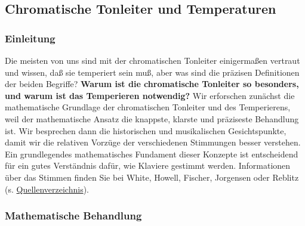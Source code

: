 
\subsection{Chromatische Tonleiter und Temperaturen}
\label{c2_2}

\subsubsection{Einleitung}
\label{c2_2a} 

Die meisten von uns sind mit der chromatischen Tonleiter einigermaßen vertraut und wissen, daß sie temperiert sein muß, aber was sind die präzisen Definitionen der beiden Begriffe?
\textbf{Warum ist die chromatische Tonleiter so besonders, und warum ist das Temperieren notwendig?}
Wir erforschen zunächst die mathematische Grundlage der chromatischen Tonleiter und des Temperierens, weil der mathematische Ansatz die knappste, klarste und präziseste Behandlung ist.
Wir besprechen dann die historischen und musikalischen Gesichtspunkte, damit wir die relativen Vorzüge der verschiedenen Stimmungen besser verstehen.
Ein grundlegendes mathematisches Fundament dieser Konzepte ist entscheidend für ein gutes Verständnis dafür, wie Klaviere gestimmt werden.
Informationen über das Stimmen finden Sie bei White, Howell, Fischer, Jorgensen oder Reblitz (s. \hyperref[reference]{Quellenverzeichnis}).
 

\label{c2_2b}

\subsubsection{Mathematische Behandlung}
\label{c2_2_math} 

